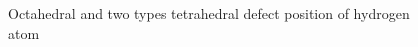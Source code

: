 \documentclass[11pt]{article}
\begin{document}
\begin{figure}[H]
\begin{minipage}[h]{0.3\linewidth}
\end{minipage}
\hfill
\begin{minipage}[h]{0.3\linewidth}
\end{minipage}
\hfill
\begin{minipage}[h]{0.3\linewidth}
\end{minipage}
\caption{Octahedral and two types tetrahedral defect position of hydrogen atom}
\label{tabular:def}
\end{figure}
\end{document}
